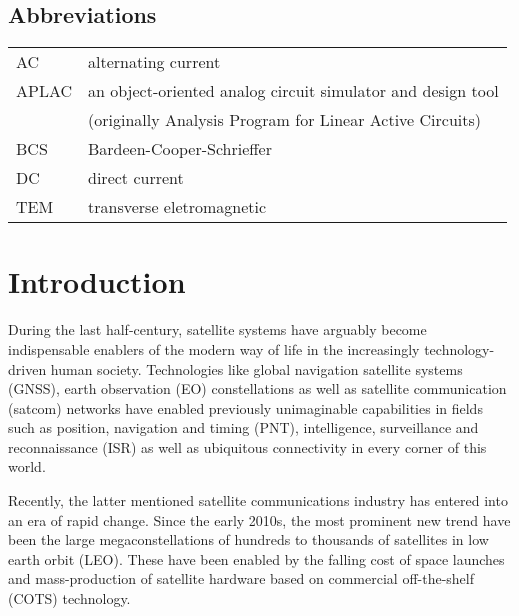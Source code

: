 \documentclass[english, 12pt, a4paper, elec, utf8, a-1b, online]{aaltothesis}
\begin{document}
\subsection*{Abbreviations}

\begin{tabular}{ll}
AC         & alternating current \\
APLAC      & an object-oriented analog circuit simulator and design tool \\
           & (originally Analysis Program for Linear Active Circuits) \\
BCS        & Bardeen-Cooper-Schrieffer \\ %
DC         & direct current \\
TEM        & transverse eletromagnetic
\end{tabular}


\cleardoublepage

\section{Introduction}


During the last half-century, satellite systems have arguably become indispensable enablers of the modern way of life in the increasingly technology-driven human society. Technologies like global navigation satellite systems (GNSS), earth observation (EO) constellations as well as satellite communication (satcom) networks have enabled previously unimaginable capabilities in fields such as position, navigation and timing (PNT), intelligence, surveillance and reconnaissance (ISR) as well as ubiquitous connectivity in every corner of this world.

Recently, the latter mentioned satellite communications industry has entered into an era of rapid change. Since the early 2010s, the most prominent new trend have been the large megaconstellations of hundreds to thousands of satellites in low earth orbit (LEO). These have been enabled by the falling cost of space launches and mass-production of satellite hardware based on commercial off-the-shelf (COTS) technology.


\end{document}
